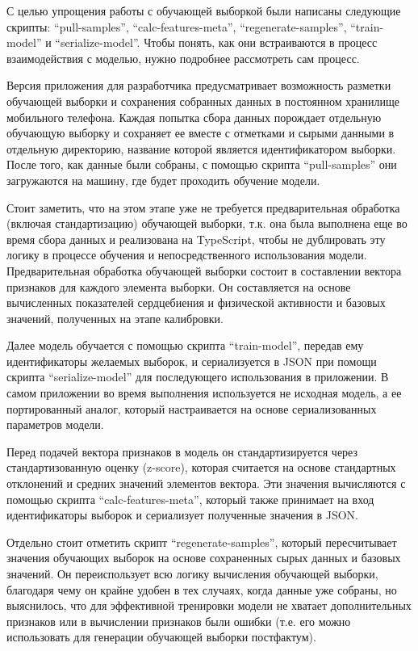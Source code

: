 \documentclass[14pt]{matmex-diploma-custom}
\begin{document}
С целью упрощения работы с обучающей выборкой были написаны следующие скрипты:
``pull-samples'', ``calc-features-meta'', ``regenerate-samples'',
``train-model'' и ``serialize-model''. Чтобы понять, как они встраиваются в
процесс взаимодействия с моделью, нужно подробнее рассмотреть сам процесс.

Версия приложения для разработчика предусматривает возможность разметки
обучающей выборки и сохранения собранных данных в постоянном хранилище
мобильного телефона. Каждая попытка сбора данных порождает отдельную обучающую
выборку и сохраняет ее вместе с отметками и сырыми данными в отдельную
директорию, название которой является идентификатором выборки. После того, как
данные были собраны, с помощью скрипта ``pull-samples'' они загружаются на
машину, где будет проходить обучение модели.

Стоит заметить, что на этом этапе уже не требуется предварительная обработка
(включая стандартизацию) обучающей выборки, т.к. она была выполнена еще во время
сбора данных и реализована на TypeScript, чтобы не дублировать эту логику в
процессе обучения и непосредственного использования модели. Предварительная
обработка обучающей выборки состоит в составлении вектора признаков для каждого
элемента выборки. Он составляется на основе вычисленных показателей сердцебиения
и физической активности и базовых значений, полученных на этапе калибровки.

Далее модель обучается с помощью скрипта ``train-model'', передав ему
идентификаторы желаемых выборок, и сериализуется в JSON при помощи скрипта
``serialize-model'' для последующего использования в приложении. В самом
приложении во время выполнения используется не исходная модель, а ее
портированный аналог, который настраивается на основе сериализованных параметров
модели.

Перед подачей вектора признаков в модель он стандартизируется через
стандартизованную оценку (z-score), которая считается на основе стандартных
отклонений и средних значений элементов вектора. Эти значения вычисляются с
помощью скрипта ``calc-features-meta'', который также принимает на вход
идентификаторы выборок и сериализует полученные значения в JSON.

Отдельно стоит отметить скрипт ``regenerate-samples'', который пересчитывает
значения обучающих выборок на основе сохраненных сырых данных и базовых
значений. Он переиспользует всю логику вычисления обучающей выборки, благодаря
чему он крайне удобен в тех случаях, когда данные уже собраны, но выяснилось,
что для эффективной тренировки модели не хватает дополнительных признаков
или в вычислении признаков были ошибки (т.е. его можно использовать для
генерации обучающей выборки постфактум).
\end{document}
